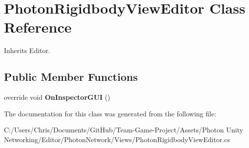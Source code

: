 \hypertarget{class_photon_rigidbody_view_editor}{}\section{Photon\+Rigidbody\+View\+Editor Class Reference}
\label{class_photon_rigidbody_view_editor}


Inherits Editor.

\subsection*{Public Member Functions}
\begin{DoxyCompactItemize}
\item 
override void {\bfseries On\+Inspector\+G\+UI} ()\hypertarget{class_photon_rigidbody_view_editor_a4bbfb02151e5116f7555ae9f31e9a91d}{}\label{class_photon_rigidbody_view_editor_a4bbfb02151e5116f7555ae9f31e9a91d}

\end{DoxyCompactItemize}


The documentation for this class was generated from the following file\+:\begin{DoxyCompactItemize}
\item 
C\+:/\+Users/\+Chris/\+Documents/\+Git\+Hub/\+Team-\/\+Game-\/\+Project/\+Assets/\+Photon Unity Networking/\+Editor/\+Photon\+Network/\+Views/Photon\+Rigidbody\+View\+Editor.\+cs\end{DoxyCompactItemize}
